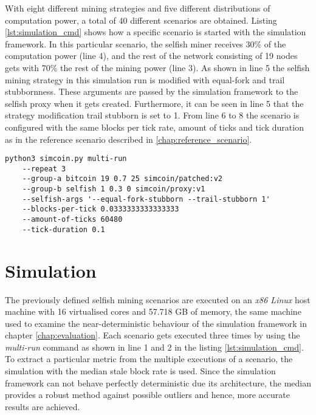 With eight different mining strategies and five different distributions of computation power, a total of 40 different scenarios are obtained.
Listing \ref{lst:simulation_cmd} shows how a specific scenario is started with the simulation framework.
In this particular scenario, the selfish miner receives 30\% of the computation power (line 4), and the rest of the network consisting of 19 nodes gets with 70\% the rest of the mining power (line 3).
As shown in line 5 the selfish mining strategy in this simulation run is modified with equal-fork and trail stubbornness.
These arguments are passed by the simulation framework to the selfish proxy when it gets created.
Furthermore, it can be seen in line 5 that the strategy modification trail stubborn is set to 1.
From line 6 to 8 the scenario is configured with the same blocks per tick rate, amount of ticks and tick duration as in the reference scenario described in \ref{chap:reference_scenario}.

\begin{minipage}{\linewidth}
\begin{lstlisting}[caption=Command to execute a particular selfish mining scenario, label={lst:simulation_cmd}, basicstyle=\ttfamily, captionpos=b]
python3 simcoin.py multi-run 
	--repeat 3 
	--group-a bitcoin 19 0.7 25 simcoin/patched:v2 
	--group-b selfish 1 0.3 0 simcoin/proxy:v1 
	--selfish-args '--equal-fork-stubborn --trail-stubborn 1' 
	--blocks-per-tick 0.0333333333333333 
	--amount-of-ticks 60480 
	--tick-duration 0.1
\end{lstlisting}
\end{minipage}

\section{Simulation}

The previously defined selfish mining scenarios are executed on an \textit{x86 Linux} host machine with 16 virtualised cores and 57.718 GB of memory, the same machine used to examine the near-deterministic behaviour of the simulation framework in chapter \ref{chap:evaluation}.
Each scenario gets executed three times by using the \textit{multi-run} command as shown in line 1 and 2 in the listing \ref{lst:simulation_cmd}.
To extract a particular metric from the multiple executions of a scenario, the simulation with the median stale block rate is used.
Since the simulation framework can not behave perfectly deterministic due its architecture, the median provides a robust method against possible outliers and hence, more accurate results are achieved.

